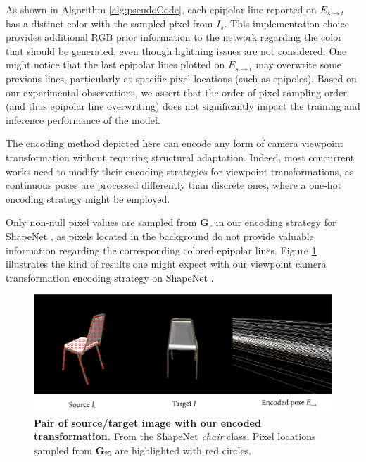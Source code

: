 As shown in Algorithm \ref{alg:pseudoCode}, each epipolar line reported on $E_{s\xrightarrow{}t}$ has a distinct color with the sampled pixel from $I_s$. This implementation choice provides additional RGB prior information to the network regarding the color that should be generated, even though lightning issues are not considered. One might notice that the last epipolar lines plotted on $E_{s\xrightarrow{}t}$ may overwrite some previous lines, particularly at specific pixel locations (such as epipoles). Based on our experimental observations, we assert that the order of pixel sampling order (and thus epipolar line overwriting) does not significantly impact the training and inference performance of the model. 

The encoding method depicted here can encode any form of camera viewpoint transformation without requiring structural adaptation. Indeed, most concurrent works need to modify their encoding strategies for viewpoint transformations, as continuous poses are processed differently than discrete ones, where a one-hot encoding strategy might be employed. 


Only non-null pixel values are sampled from $\textbf{G}_{r}$ in our encoding strategy for ShapeNet \citep{chang2015shapenet}, as pixels located in the background do not provide valuable information regarding the corresponding colored epipolar lines. Figure \ref{fig:examplePoseEncoded} illustrates the kind of results one might expect with our viewpoint camera transformation encoding strategy on ShapeNet \citep{chang2015shapenet}. 


\begin{figure}[h!]
\begin{center}
\includegraphics[width=\textwidth]{images/epipolarnvs/EpipolarNVS_encoded.png}
\end{center}
\caption{\textbf{Pair of source/target image with our encoded transformation.} From the ShapeNet \citep{chang2015shapenet} \textit{chair} class. Pixel locations sampled from $\textbf{G}_{25}$ are highlighted with red circles.}
\label{fig:examplePoseEncoded}
\end{figure}


